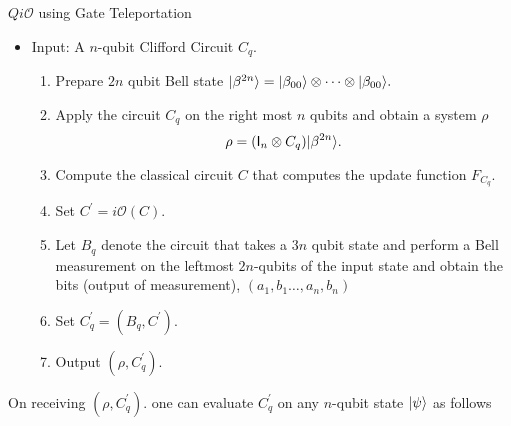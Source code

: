 \begin{algorithm}[H]
   \caption{$Qi\mathcal{O}$ using Gate Teleportation}
  \begin{itemize}
  \item Input: A $n$-qubit Clifford Circuit $C_q.$
  \begin{enumerate}
  \item Prepare $2n$ qubit Bell state ${\lvert}\beta^{ 2n}\rangle={\lvert}\beta_{00}\rangle\otimes \cdots \otimes {\lvert}\beta_{00}\rangle.$
  \item Apply the circuit $C_q$ on the right most $n$ qubits and obtain a system $\rho$
  										 $$\rho=({\sf I}_n\otimes C_q) {\lvert}\beta^{2n}\rangle.$$
 \item Compute the classical circuit $C$ that computes the update function $F_{C_q}.$	
 \item  Set $C^\prime=i\mathcal{O}(C).$							 
  \item Let $B_q$ denote the circuit that takes a $3n$ qubit state and perform a Bell measurement on the leftmost $2n$-qubits of the input state and obtain the bits (output of measurement), $(a_1,b_1\ldots,a_n,b_n)$ 
  \item Set $C_q^\prime=(B_q, C^\prime).$
  \item Output $\left(\rho,C_q^\prime \right).$
  \end{enumerate}
  \end{itemize}
\end{algorithm}

On receiving $\left(\rho,C_q^\prime \right).$ one can evaluate $C_q^\prime$ on any $n$-qubit state ${\lvert}\psi\rangle$ as follows

